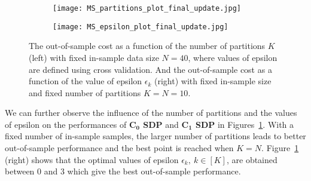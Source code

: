 \documentclass{article}
\begin{document}
	\begin{figure}[t!]
 		\begin{center}
		\begin{subfigure}[b]{.5\textwidth}
			\texttt{[image: MS\_partitions\_plot\_final\_update.jpg]}
		\end{subfigure}\hfill%
		\begin{subfigure}[b]{.5\textwidth}
			\texttt{[image: MS\_epsilon\_plot\_final\_update.jpg]}
		\end{subfigure}\hfill%
		\vspace{-3mm}
		\caption{The out-of-sample cost as a function of the number of partitions $K$ (left) with fixed in-sample data size $N = 40$, where values of epsilon are defined using cross validation. And the out-of-sample cost as a function of the value of epsilon $\epsilon_k$ (right) with fixed in-sample size and fixed number of partitions $K = N = 10$.}
		    \label{fig:MS}
 		\end{center}
 	\end{figure}
 	
We can further observe the influence of the number of partitions and the values of epsilon on the performances of \textbf{$\mathbf{C_0}$ SDP} and \textbf{$\mathbf{C_1}$ SDP} in Figures~\ref{fig:MS}. With a fixed number of in-sample samples, the larger number of partitions leads to better out-of-sample performance and the best point is reached when $K=N$. Figure~\ref{fig:MS} (right) shows that the optimal values of epsilon $\epsilon_k, \ k \in [K]$, are obtained between 0 and 3 which give the best out-of-sample performance.
\end{document}

